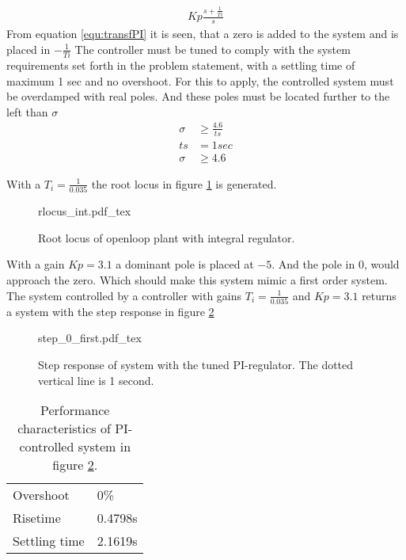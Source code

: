 \documentclass[../../../Main]{subfiles}
\begin{document}
\begin{align}
	Kp \frac{s+\frac{1}{Ti}}{s}
	\label{equ:transfPI}
\end{align}
From equation \eqref{equ:transfPI} it is seen, that a zero is added to the system and is placed in $-\frac{1}{Ti} $
The controller must be tuned to comply with the system requirements set forth in the problem statement, with a settling time of maximum 1 sec and no overshoot. For this to apply, the controlled system must be overdamped with real poles. And these poles must be located further to the left than $\sigma$
\begin{align}
	\sigma &\ge \frac{4.6}{ts}\\
	ts &= 1 sec\\
	\sigma &\ge 4.6
\end{align}

With a $T_i = \frac{1}{0.035}$ the root locus in figure \ref{fig:rlocus_int} is generated.

\begin{figure}[H]
\centering
\def\svgwidth{\textwidth}
{rlocus_int.pdf_tex}
\caption{Root locus of openloop plant with integral regulator.}
\label{fig:rlocus_int}
\end{figure}

With a gain $Kp = 3.1$ a dominant pole is placed at $-5$. And the pole in 0, would approach the zero. Which should make this system mimic a first order system. The system controlled by a controller with gains $T_i = \frac{1}{0.035}$ and $Kp = 3.1$ returns a system with the step response in figure \ref{fig:step_0_first}

\begin{figure}[H]
\centering
\def\svgwidth{\textwidth}
{step_0_first.pdf_tex}
\caption{Step response of system with the tuned PI-regulator. The dotted vertical line is 1 second.}
\label{fig:step_0_first}
\end{figure}

\begin{table}[h]
	 \centering
	 \begin{tabular}{ll}
		 Overshoot & 0\%\\
		 Risetime & 0.4798s\\
		 Settling time & 2.1619s
	 \end{tabular}
	 \caption{Performance characteristics of PI-controlled system in figure \ref{fig:step_0_first}.}
	 \label{tab:performance_0_1}
\end{table}
\end{document}

